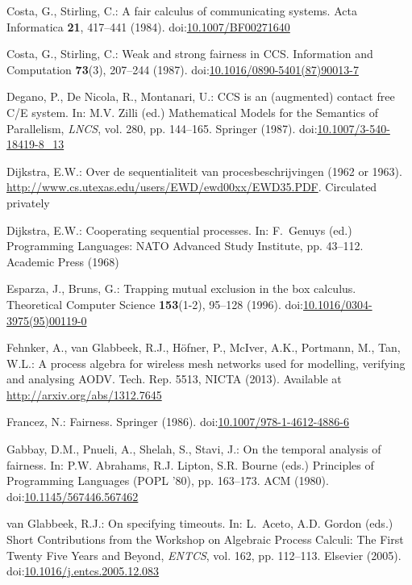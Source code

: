\documentclass[smallcondensed]{svjour3}
\providecommand{\urlalt}[2]{\href{#1}{#2}}
\providecommand{\doi}[1]{doi:\urlalt{http://dx.doi.org/#1}{#1}}
\begin{document}
\begin{thebibliography}{10}
Costa, G., Stirling, C.: A fair calculus of communicating systems.
\newblock Acta Informatica \textbf{21}, 417--441 (1984).
\newblock \doi{10.1007/BF00271640}

Costa, G., Stirling, C.: Weak and strong fairness in {CCS}.
\newblock Information and Computation \textbf{73}(3), 207--244 (1987).
\newblock \doi{10.1016/0890-5401(87)90013-7}

Degano, P., {De Nicola}, R., Montanari, U.: {CCS} is an (augmented) contact
  free {C/E} system.
\newblock In: M.V. Zilli (ed.) Mathematical Models for the Semantics of
  Parallelism, \emph{\rm LNCS}, vol. 280, pp. 144--165. Springer (1987).
\newblock \doi{10.1007/3-540-18419-8\_13}

Dijkstra, E.W.: Over de sequentialiteit van procesbeschrijvingen (1962 or
  1963).
\newblock \urlprefix\url{http://www.cs.utexas.edu/users/EWD/ewd00xx/EWD35.PDF}.
\newblock Circulated privately

Dijkstra, E.W.: Cooperating sequential processes.
\newblock In: F.~Genuys (ed.) Programming Languages: NATO Advanced Study
  Institute, pp. 43--112. Academic Press (1968)

Esparza, J., Bruns, G.: Trapping mutual exclusion in the box calculus.
\newblock Theoretical Computer Science \textbf{153}(1-2), 95--128 (1996).
\newblock \doi{10.1016/0304-3975(95)00119-0}

Fehnker, A., van Glabbeek, R.J., H{\"o}fner, P., McIver, A.K., Portmann, M.,
  Tan, W.L.: A process algebra for wireless mesh networks used for modelling,
  verifying and analysing {AODV}.
\newblock Tech. Rep. 5513, NICTA (2013).
\newblock Available at \url{http://arxiv.org/abs/1312.7645}

Francez, N.: Fairness.
\newblock Springer (1986).
\newblock \doi{10.1007/978-1-4612-4886-6}

Gabbay, D.M., Pnueli, A., Shelah, S., Stavi, J.: On the temporal analysis of
  fairness.
\newblock In: P.W. Abrahams, R.J. Lipton, S.R. Bourne (eds.) Principles of
  Programming Languages {(POPL '80)}, pp. 163--173. ACM (1980).
\newblock \doi{10.1145/567446.567462}

van Glabbeek, R.J.: On specifying timeouts.
\newblock In: L.~Aceto, A.D. Gordon (eds.) {\rm Short Contributions from the
  Workshop on} Algebraic Process Calculi: The First Twenty Five Years and
  Beyond, \emph{\rm ENTCS}, vol. 162, pp. 112--113. Elsevier (2005).
\newblock \doi{10.1016/j.entcs.2005.12.083}


\end{thebibliography}
\end{document}
